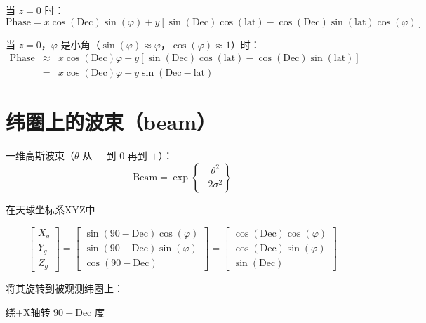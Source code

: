 \documentclass[11pt, a4paper]{article}  %
\begin{document}
\begin{CJK}{UTF8}{gbsn}
当 $z=0$ 时：
\begin{equation}
	\text{Phase} = x\cos(\text{Dec})\sin(\varphi) + y\left[ \sin(\text{Dec})\cos(\text{lat}) - \cos(\text{Dec})\sin(\text{lat})\cos(\varphi) \right]
\end{equation}

当 $z=0$，$\varphi$ 是小角（$\sin(\varphi) \approx \varphi$，$\cos(\varphi) \approx 1$）时：
\begin{eqnarray}
	\text{Phase} &\approx& x\cos(\text{Dec})\varphi + y\left[ \sin(\text{Dec})\cos(\text{lat}) - \cos(\text{Dec})\sin(\text{lat}) \right] \nonumber \\
		&=& x\cos(\text{Dec})\varphi + y\sin(\text{Dec}-\text{lat})
\end{eqnarray}




\section{纬圈上的波束（beam）}

一维高斯波束（$\theta$ 从 $-$ 到 $0$ 再到 $+$）：
\begin{equation} 
	\text{Beam} = \exp\left\{-\frac{\theta^2}{2\sigma^2}\right\}
\end{equation}

在天球坐标系XYZ中

\begin{equation}
	\begin{bmatrix} X_g \\ Y_g \\ Z_g \end{bmatrix}
		= \begin{bmatrix} \sin(90-\text{Dec})\cos(\varphi) \\ \sin(90-\text{Dec})\sin(\varphi) \\ \cos(90-\text{Dec}) \end{bmatrix}
		= \begin{bmatrix} \cos(\text{Dec})\cos(\varphi) \\ \cos(\text{Dec})\sin(\varphi) \\ \sin(\text{Dec}) \end{bmatrix} 
\end{equation}

将其旋转到被观测纬圈上：

\indent\indent 绕+X轴转 $90-\text{Dec}$ 度


\end{CJK}
\end{document}
